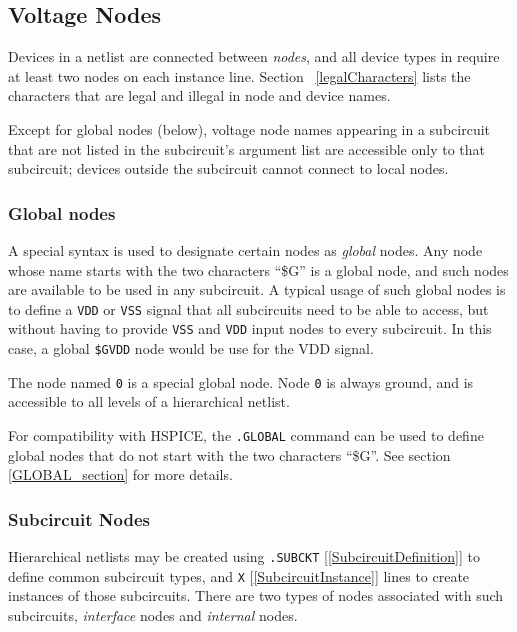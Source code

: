 



\clearpage
\subsection{Voltage Nodes}
\label{Voltage_Nodes}
  

Devices in a netlist are connected between {\em nodes}, and all device
types in \Xyce{} require at least two nodes on each instance line. Section
~\ref{legalCharacters} lists the characters that are legal and illegal in
\Xyce{} node and device names.

Except for global nodes (below), voltage node names appearing in a
subcircuit that are not listed in the subcircuit's argument list are
accessible only to that subcircuit; devices outside the subcircuit
cannot connect to local nodes.

\subsubsection{Global nodes}
A special syntax is used to designate certain nodes as {\em global}
nodes.  Any node whose name starts with the two characters ``\$G'' is
a global node, and such nodes are available to be used in any
subcircuit.  A typical usage of such global nodes is to define a \texttt{VDD}
or \texttt{VSS} signal that all subcircuits need to be able to access, but
without having to provide \texttt{VSS} and \texttt{VDD} input
nodes to every subcircuit.  In this case, a global \texttt{\$GVDD} node
would be use for the VDD signal.

The node named \texttt{0} is a special global node.  Node \texttt{0}
is always ground, and is accessible to all levels of a hierarchical
netlist.

For compatibility with HSPICE, the \texttt{.GLOBAL} command can
be used to define global nodes that do not start with the two
characters ``\$G''.  See section \ref{GLOBAL_section} for more details.

\subsubsection{Subcircuit Nodes}

Hierarchical netlists may be created using
\texttt{.SUBCKT} [\ref{SubcircuitDefinition}] to define common subcircuit
types, and \texttt{X} [\ref{SubcircuitInstance}] lines to create
instances of those subcircuits.  There are two types of nodes
associated with such subcircuits, {\em interface\/} nodes and {\em
internal\/} nodes.

